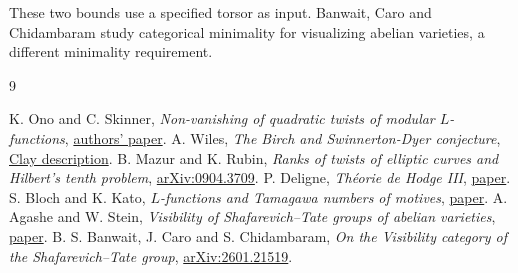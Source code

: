 \documentclass[11pt]{article}
\begin{document}
These two bounds use a specified torsor as input. Banwait, Caro and
Chidambaram \cite{BCC} study categorical minimality for visualizing
abelian varieties, a different minimality requirement.

\begin{thebibliography}{9}\raggedright
{} K. Ono and C. Skinner, \emph{Non-vanishing of quadratic twists
of modular $L$-functions}, \href{https://uva.theopenscholar.com/files/ken-ono/files/037.pdf}{authors' paper}.
 A. Wiles, \emph{The Birch and Swinnerton-Dyer conjecture},
\href{https://www.claymath.org/wp-content/uploads/2022/05/birchswin.pdf}{Clay description}.
 B. Mazur and K. Rubin, \emph{Ranks of twists of elliptic curves
and Hilbert's tenth problem}, \href{https://arxiv.org/abs/0904.3709}{arXiv:0904.3709}.
 P. Deligne, \emph{Th\'eorie de Hodge III},
\href{https://doi.org/10.1007/BF02685881}{paper}.
 S. Bloch and K. Kato, \emph{$L$-functions and Tamagawa
numbers of motives}, \href{https://math.stanford.edu/~conrad/BSDseminar/refs/BKTamagawa.pdf}{paper}.
 A. Agashe and W. Stein, \emph{Visibility of Shafarevich--Tate
groups of abelian varieties}, \href{https://wstein.org/papers/visibility_of_sha/jnt_version.pdf}{paper}.
 B. S. Banwait, J. Caro and S. Chidambaram,
\emph{On the Visibility category of the Shafarevich--Tate group},
\href{https://arxiv.org/abs/2601.21519}{arXiv:2601.21519}.
\end{thebibliography}
\end{document}
